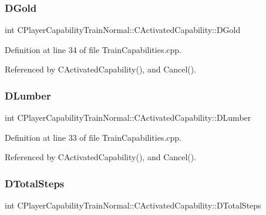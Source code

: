 \subsubsection{\texorpdfstring{D\+Gold}{DGold}}
{\footnotesize\ttfamily int C\+Player\+Capability\+Train\+Normal\+::\+C\+Activated\+Capability\+::\+D\+Gold\hspace{0.3cm}{\ttfamily [protected]}}



Definition at line 34 of file Train\+Capabilities.\+cpp.



Referenced by C\+Activated\+Capability(), and Cancel().

\hypertarget{classCPlayerCapabilityTrainNormal_1_1CActivatedCapability_a49a77c92b6146819efb1a7a8b6fb8972}{}\label{classCPlayerCapabilityTrainNormal_1_1CActivatedCapability_a49a77c92b6146819efb1a7a8b6fb8972} 
\subsubsection{\texorpdfstring{D\+Lumber}{DLumber}}
{\footnotesize\ttfamily int C\+Player\+Capability\+Train\+Normal\+::\+C\+Activated\+Capability\+::\+D\+Lumber\hspace{0.3cm}{\ttfamily [protected]}}



Definition at line 33 of file Train\+Capabilities.\+cpp.



Referenced by C\+Activated\+Capability(), and Cancel().

\hypertarget{classCPlayerCapabilityTrainNormal_1_1CActivatedCapability_a2bee6a6395fd7cc0fcf4001bbbadb165}{}\label{classCPlayerCapabilityTrainNormal_1_1CActivatedCapability_a2bee6a6395fd7cc0fcf4001bbbadb165} 
\subsubsection{\texorpdfstring{D\+Total\+Steps}{DTotalSteps}}
{\footnotesize\ttfamily int C\+Player\+Capability\+Train\+Normal\+::\+C\+Activated\+Capability\+::\+D\+Total\+Steps\hspace{0.3cm}{\ttfamily [protected]}}




